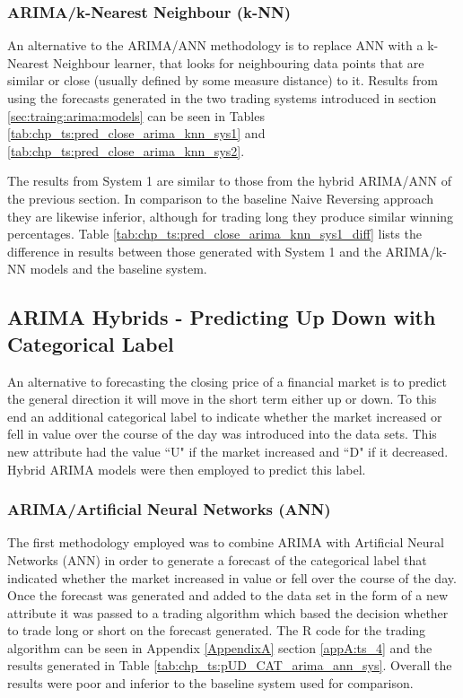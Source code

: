 

\subsubsection{ARIMA/k-Nearest Neighbour (k-NN)}
An alternative to the ARIMA/ANN methodology is to replace ANN with a k-Nearest Neighbour learner, that looks for neighbouring data points that are similar or close (usually defined by some measure distance) to it. Results from using the forecasts generated in the two trading systems introduced in section \ref{sec:traing:arima:models} can be seen in Tables \ref{tab:chp_ts:pred_close_arima_knn_sys1} and \ref{tab:chp_ts:pred_close_arima_knn_sys2}. 

The results from System 1 are similar to those from the hybrid ARIMA/ANN of the previous section. In comparison to the baseline Naive Reversing approach they are likewise inferior, although for trading long they produce similar winning percentages. Table \ref{tab:chp_ts:pred_close_arima_knn_sys1_diff} lists the difference in results between those generated with System 1 and the ARIMA/k-NN models and the baseline system.



\subsection{ARIMA Hybrids - Predicting Up Down with Categorical Label}
An alternative to forecasting the closing price of a financial market is to predict the general direction it will move in the short term either up or down. To this end an additional categorical label to indicate whether the market increased or fell in value over the course of the day was introduced into the data sets. This new attribute had the value  \textquotedblleft U" if the market increased and \textquotedblleft D" if it decreased. Hybrid ARIMA models were then employed to predict this label.

\subsubsection{ARIMA/Artificial Neural Networks (ANN)}
The first methodology employed was to combine ARIMA with Artificial Neural Networks (ANN) in order to generate a forecast of the categorical label that indicated whether the market increased in value or fell over the course of the day. Once the forecast was generated and added to the data set in the form of a new attribute it was passed to a trading algorithm which based the decision whether to trade long or short on the forecast generated. The R code for the trading algorithm can be seen in Appendix \ref{AppendixA} section \ref{appA:ts_4} and the results generated in Table \ref{tab:chp_ts:pUD_CAT_arima_ann_sys}. Overall the results were poor and inferior to the baseline system used for comparison. 

